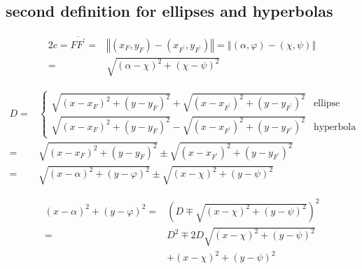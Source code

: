 \documentclass[
]{book}
\theoremstyle{definition}
\theoremstyle{definition}
\theoremstyle{definition}
\theoremstyle{definition}
\theoremstyle{remark}
\begin{document}
\hypertarget{second-definition-for-ellipses-and-hyperbolas}{%
\subsection{second definition for ellipses and hyperbolas}\label{second-definition-for-ellipses-and-hyperbolas}}

\[
\begin{aligned}
2c=\overline{FF^{\prime}}= & \left\Vert \left(x_{{\scriptscriptstyle F}},y_{{\scriptscriptstyle F}}\right)-\left(x_{{\scriptscriptstyle F^{\prime}}},y_{{\scriptscriptstyle F^{\prime}}}\right)\right\Vert =\left\Vert \left(\alpha,\varphi\right)-\left(\chi,\psi\right)\right\Vert \\
= & \sqrt{\left(\alpha-\chi\right)^{2}+\left(\chi-\psi\right)^{2}}
\end{aligned}
\]

\[
\begin{aligned}
D= & \begin{cases}
\sqrt{\left(x-x_{{\scriptscriptstyle F}}\right)^{2}+\left(y-y_{{\scriptscriptstyle F}}\right)^{2}}+\sqrt{\left(x-x_{{\scriptscriptstyle F^{\prime}}}\right)^{2}+\left(y-y_{{\scriptscriptstyle F^{\prime}}}\right)^{2}} & \text{ellipse}\\
\sqrt{\left(x-x_{{\scriptscriptstyle F}}\right)^{2}+\left(y-y_{{\scriptscriptstyle F}}\right)^{2}}-\sqrt{\left(x-x_{{\scriptscriptstyle F^{\prime}}}\right)^{2}+\left(y-y_{{\scriptscriptstyle F^{\prime}}}\right)^{2}} & \text{hyperbola}
\end{cases}\\
= & \sqrt{\left(x-x_{{\scriptscriptstyle F}}\right)^{2}+\left(y-y_{{\scriptscriptstyle F}}\right)^{2}}\pm\sqrt{\left(x-x_{{\scriptscriptstyle F^{\prime}}}\right)^{2}+\left(y-y_{{\scriptscriptstyle F^{\prime}}}\right)^{2}}\\
= & \sqrt{\left(x-\alpha\right)^{2}+\left(y-\varphi\right)^{2}}\pm\sqrt{\left(x-\chi\right)^{2}+\left(y-\psi\right)^{2}}
\end{aligned}
\]

\[
\begin{aligned}
\left(x-\alpha\right)^{2}+\left(y-\varphi\right)^{2}= & \left(D\mp\sqrt{\left(x-\chi\right)^{2}+\left(y-\psi\right)^{2}}\right)^{2}\\
= & D^{2}\mp2D\sqrt{\left(x-\chi\right)^{2}+\left(y-\psi\right)^{2}}\\
 & +\left(x-\chi\right)^{2}+\left(y-\psi\right)^{2}
\end{aligned}
\]
\end{document}

